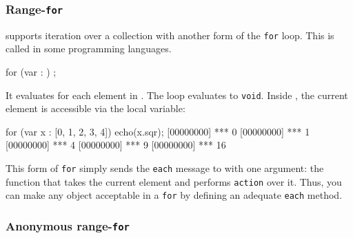 \subsubsection{Range-\lstinline{for}}
\label{sec:lang:for:each}

\us supports iteration over a collection with another form of the
\lstinline{for} loop.  This is called  in some
programming languages.


\begin{urbiunchecked}
for (var  : )
   ;
\end{urbiunchecked}

It evaluates  for each element in . The loop
evaluates to \lstinline{void}.  Inside , the current element is
accessible via the  local variable:

\begin{urbiscript}
for (var x : [0, 1, 2, 3, 4])
  echo(x.sqr);
[00000000] *** 0
[00000000] *** 1
[00000000] *** 4
[00000000] *** 9
[00000000] *** 16
\end{urbiscript}

This form of \lstinline{for} simply sends the \lstinline{each} message to
 with one argument: the function that takes the current
element and performs \lstinline{action} over it. Thus, you can make any
object acceptable in a \lstinline{for} by defining an adequate
\lstinline{each} method.


\subsubsection{Anonymous range-\lstinline{for}}
\label{sec:lang:for:n}

